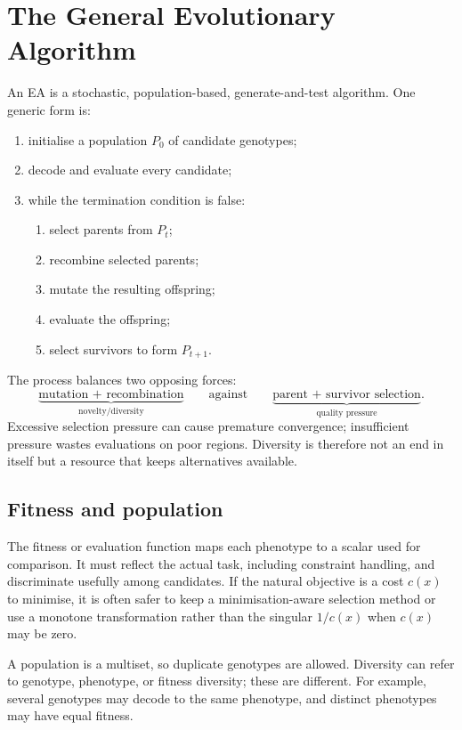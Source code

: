 \documentclass[11pt,a4paper]{article}
\begin{document}
\section{The General Evolutionary Algorithm}

An EA is a stochastic, population-based, generate-and-test algorithm.
One generic form is:

\begin{enumerate}[leftmargin=*]
  \item initialise a population $P_0$ of candidate genotypes;
  \item decode and evaluate every candidate;
  \item while the termination condition is false:
    \begin{enumerate}
      \item select parents from $P_t$;
      \item recombine selected parents;
      \item mutate the resulting offspring;
      \item evaluate the offspring;
      \item select survivors to form $P_{t+1}$.
    \end{enumerate}
\end{enumerate}

The process balances two opposing forces:
\[
  \underbrace{\text{mutation + recombination}}_{\text{novelty/diversity}}
  \qquad\text{against}\qquad
  \underbrace{\text{parent + survivor selection}}_{\text{quality pressure}}.
\]
Excessive selection pressure can cause premature convergence; insufficient
pressure wastes evaluations on poor regions.  Diversity is therefore not an
end in itself but a resource that keeps alternatives available.

\subsection{Fitness and population}

The fitness or evaluation function maps each phenotype to a scalar used for
comparison.  It must reflect the actual task, including constraint handling,
and discriminate usefully among candidates.  If the natural objective is a
cost $c(x)$ to minimise, it is often safer to keep a minimisation-aware
selection method or use a monotone transformation rather than the singular
$1/c(x)$ when $c(x)$ may be zero.

A population is a multiset, so duplicate genotypes are allowed.  Diversity
can refer to genotype, phenotype, or fitness diversity; these are different.
For example, several genotypes may decode to the same phenotype, and distinct
phenotypes may have equal fitness.
\end{document}
